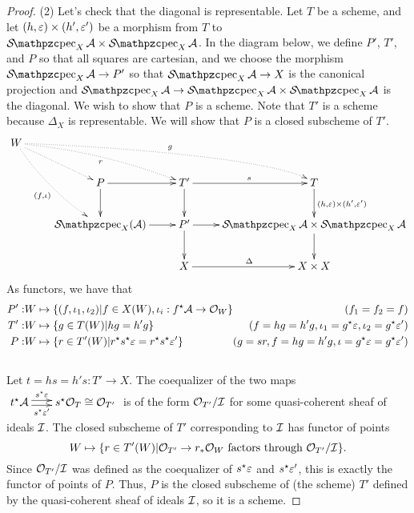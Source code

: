 \begin{proof}
    (2) Let's check that the diagonal is representable. Let $T$ be a scheme, and let
   $(h,\varepsilon)\times (h',\varepsilon')$ be a morphism from $T$ to $\Spec_X \A\times\Spec_X \A$.
   In the diagram below, we define $P'$, $T'$, and $P$ so that all
   squares are cartesian, and we choose the morphism $\Spec_X \A\to P'$ so that
   $\Spec_X\A\to X$ is the canonical projection and $\Spec_X\A\to
   \Spec_X\A\times\Spec_X\A$ is the diagonal. We wish to show that $P$ is a scheme. Note
   that $T'$ is a scheme because $\Delta_X$ is representable. We will show that $P$ is a
   closed subscheme of $T'$.
   \[\xymatrix{
    W \ar@{.>}[dr] \ar@{.>}@/^/[drr]_{r} \ar@{.>}@(r,ul)[drrr]^g \ar@{.>}@/_/[ddr]_{(f,\iota)}\\
    & P \ar[r]\ar[d] & T'\ar[r]^s\ar[d] & T\ar[d]^{(h,\e)\times (h',\e')}\\
    & \Spec_X (\A) \ar[r] & P' \ar[r]\ar[d] & \Spec_X \A \times \Spec_X \A \ar[d] \\
    & & X\ar[r]^\Delta & X\times X
   }\]
    As functors, we have that
   \begin{align*}
     P':& W\mapsto \{(f,\iota_1,\iota_2)|f\in X(W), \iota_i:f^\star\mathcal{A}\to \mathcal{O}_W\}\hspace{-1em} & (f_1=f_2=f) \\
     T':& W\mapsto \{g\in T(W)|hg=h'g\} & (f=hg=h'g, \iota_1=g^\star \varepsilon, \iota_2=g^\star \varepsilon')\\
      P:& W\mapsto \{r\in T'(W)|r^\star s^\star \varepsilon=r^\star s^\star\varepsilon'\} & (g=sr,f=hg=h'g,\iota=g^\star\varepsilon=g^\star\varepsilon')
   \end{align*}
   \\
   Let $t = hs=h's:T'\to X$. The coequalizer of the two maps $\xymatrix@-.5pc{t^\star \A
   \ar@<.5ex>[r]^<>(.5){s^\star\e} \ar@<-.5ex>[r]_<>(.5){s^\star\e'}& s^\star \O_T\cong \O_{T'}}$ is of the
   form $\mathcal{O}_{T'}/\mathcal{I}$ for some quasi-coherent sheaf of ideals $\mathcal{I}$. The closed subscheme
   of $T'$ corresponding to $\mathcal{I}$ has functor of points
   \[
    W\mapsto \{r\in T'(W)|\mathcal{O}_{T'}\to r_*\mathcal{O}_W\text{ factors through }\mathcal{O}_{T'}/\mathcal{I}\}.
   \]
    Since $\mathcal{O}_{T'}/\mathcal{I}$ was defined as the coequalizer of $s^\star \varepsilon$ and $s^\star \varepsilon'$,
   this is exactly the functor of points of $P$. Thus, $P$ is the closed subscheme of
   (the scheme) $T'$ defined by the quasi-coherent sheaf of ideals $\mathcal{I}$, so it is a
   scheme.


\end{proof}

